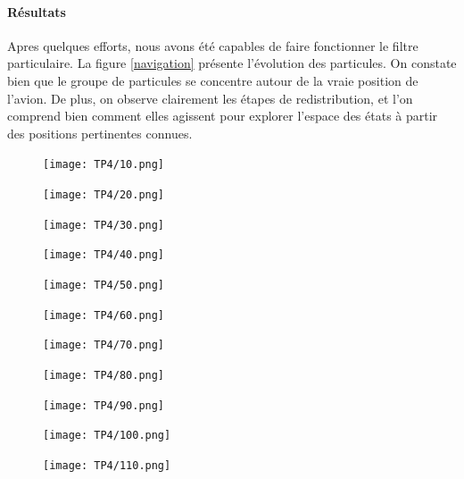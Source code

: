 \documentclass{article}
\begin{document}
 \paragraph{Résultats}
 Apres quelques efforts, nous avons été capables de faire fonctionner le 
 filtre particulaire. La figure \ref{navigation} présente l'évolution des
 particules. On constate bien que le groupe de particules se concentre autour de la 
 vraie position de l'avion. De plus, on observe clairement les étapes de redistribution,
 et l'on comprend bien comment elles agissent pour explorer l'espace des états à partir
 des positions pertinentes connues.
 

 \begin{figure}[h!]
   \centering
   \begin{minipage}[t]{4cm}
       \centering
       \texttt{[image: TP4/10.png]}
   \end{minipage}
   \begin{minipage}[t]{4cm}
       \centering
       \texttt{[image: TP4/20.png]}
   \end{minipage}
   \begin{minipage}[t]{4cm}
      \centering
      \texttt{[image: TP4/30.png]}
  \end{minipage}
  \begin{minipage}[t]{4cm}
   \centering
   \texttt{[image: TP4/40.png]}
\end{minipage}
\begin{minipage}[t]{4cm}
   \centering
   \texttt{[image: TP4/50.png]}
\end{minipage}
\begin{minipage}[t]{4cm}
   \centering
   \texttt{[image: TP4/60.png]}
\end{minipage}
\begin{minipage}[t]{4cm}
   \centering
   \texttt{[image: TP4/70.png]}
\end{minipage}
\begin{minipage}[t]{4cm}
   \centering
   \texttt{[image: TP4/80.png]}
\end{minipage}
\begin{minipage}[t]{4cm}
   \centering
   \texttt{[image: TP4/90.png]}
\end{minipage}
\begin{minipage}[t]{4cm}
   \centering
   \texttt{[image: TP4/100.png]}
\end{minipage}
\begin{minipage}[t]{4cm}
   \centering
   \texttt{[image: TP4/110.png]}
\end{minipage}

\end{figure}
\end{document}
